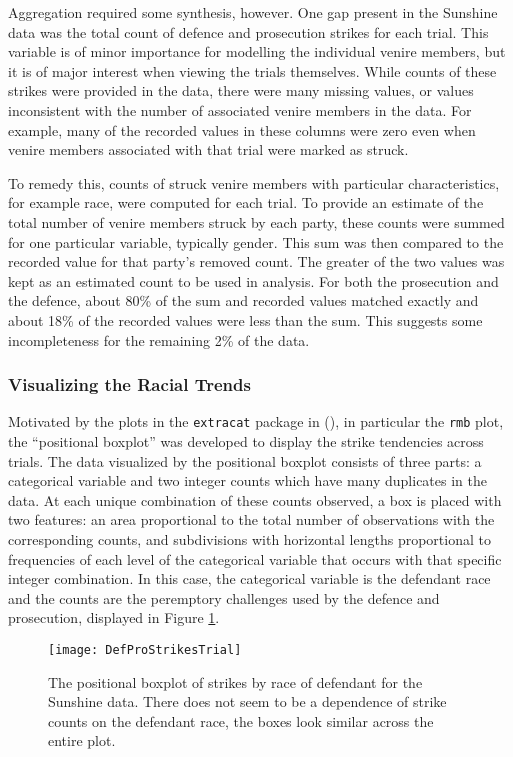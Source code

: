 Aggregation required some synthesis, however. One gap present in the Sunshine data was the total count of defence and prosecution strikes for each trial. This
variable is of minor importance for modelling the individual venire
members, but it is of major interest when viewing the trials
themselves. While counts of these strikes were provided in the data, there were many missing values, or values inconsistent with
the number of associated venire members in the data. For example, many of the recorded values in these columns were zero even when
venire members associated with that trial were marked as struck.

To remedy this,  counts of struck venire members with particular characteristics, for example race, were computed for each trial. To
provide an estimate of the total number of venire members struck by each
party, these counts were summed for one particular
variable, typically gender. This sum was then compared to the recorded value for that party's removed count. The greater of the two
values was kept as an estimated count to be used in analysis. For both the prosecution and the defence, about 80\% of the sum and
recorded values matched exactly and about 18\% of the recorded values were less than the sum. This suggests some incompleteness
for the remaining 2\% of the data.

\subsubsection{Visualizing the Racial Trends} \label{subsec:vistrend}

Motivated by the plots in the \texttt{extracat} package in \R
(\cite{extracat}), in particular the \texttt{rmb} plot, the ``positional boxplot'' was developed to display the strike tendencies across
trials. The data visualized by the positional boxplot consists of three parts:
a categorical variable and two integer counts which have many
duplicates in the data. At each unique combination of these counts observed, a box is
placed with two features: an area proportional to the total
number of observations with the corresponding counts, and subdivisions
with horizontal lengths proportional to frequencies of each level of the categorical
variable that occurs with that specific integer combination. In this
case, the categorical variable is the defendant race and the counts
are the peremptory challenges used by the defence and prosecution,
displayed in Figure \ref{fig:trialprodef}.

\begin{figure}[h!]
  \centering
  \texttt{[image: DefProStrikesTrial]}
  \caption[Prosecution and Defence Strikes by Trial]{\footnotesize The positional boxplot of strikes by race of defendant for the
    Sunshine data. There does not seem to be a dependence of strike counts on the defendant race, the boxes look similar across
    the entire plot.}
  \label{fig:trialprodef}
\end{figure}

